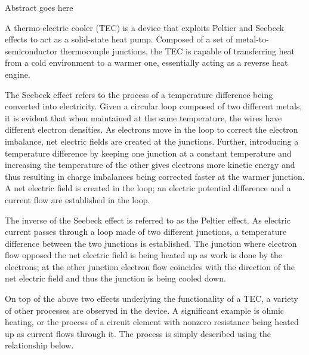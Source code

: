 

\physics

\begin{paperabs}
	
	Abstract goes here
	
\end{paperabs}

\begin{paper}
	
	
	A thermo-electric cooler (TEC) is a device that exploits Peltier and Seebeck effects to act as a solid-state heat pump. Composed of a set of metal-to-semiconductor thermocouple junctions, the TEC is capable of transferring heat from a cold environment to a warmer one, essentially acting as a reverse heat engine. 
	
	The Seebeck effect refers to the process of a temperature difference being converted into electricity. Given a circular loop composed of two different metals, it is evident that when maintained at the same temperature, the wires have different electron densities. As electrons move in the loop to correct the electron imbalance, net electric fields are created at the junctions. Further, introducing a temperature difference by keeping one junction at a constant temperature and increasing the temperature of the other gives electrons more kinetic energy and thus resulting in charge imbalances being corrected faster at the warmer junction. A net electric field is created in the loop; an electric potential difference and a current flow are established in the loop.
	
	The inverse of the Seebeck effect is referred to as the Peltier effect. As electric current passes through a loop made of two different junctions, a temperature difference between the two junctions is established. The junction where electron flow opposed the net electric field is being heated up as work is done by the electrons; at the other junction electron flow coincides with the direction of the net electric field and thus the junction is being cooled down. 
	
	On top of the above two effects underlying the functionality of a TEC, a variety of other processes are observed in the device. A significant example is ohmic heating, or the process of a circuit element with nonzero resistance being heated up as current flows through it. The process is simply described using the relationship below. 
	

\end{paper}
